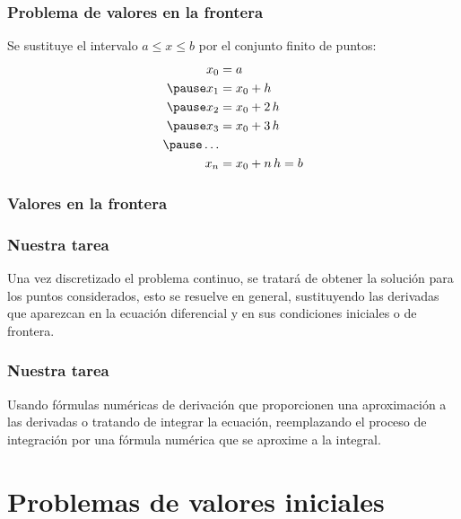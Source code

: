 \documentclass[12pt]{beamer}
\begin{document}
\begin{frame}
\frametitle{Problema de valores en la frontera}
Se sustituye el intervalo $a \leq x \leq b $ por el conjunto finito de puntos:
\pause
\begin{eqnarray*}
\begin{aligned}
x_{0} & = a \\ \pause
x_{1} & = x_{0} + h \\ \pause
x_{2} & = x_{0} + 2 \, h \\ \pause
x_{3} & = x_{0} + 3 \, h \\ \pause
\ldots \\
x_{n} & = x_{0} + n \, h = b
\end{aligned}
\end{eqnarray*}
\end{frame}
\begin{frame}[fragile]
\frametitle{Valores en la frontera}
\end{frame}
\begin{frame}
\frametitle{Nuestra tarea}
Una vez discretizado el problema continuo, se tratará de obtener la solución para los puntos considerados, esto se resuelve en general, sustituyendo las derivadas que aparezcan en la ecuación diferencial y en sus condiciones iniciales o de frontera.
\end{frame}
\begin{frame}
\frametitle{Nuestra tarea}
Usando fórmulas numéricas de derivación que proporcionen una aproximación a las derivadas o tratando de integrar la ecuación, reemplazando el proceso de integración por una fórmula numérica que se aproxime a la integral.
\end{frame}

\section{Problemas de valores iniciales}
\end{document}
